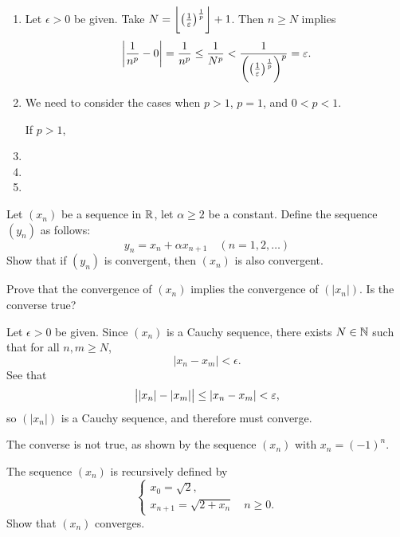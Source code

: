 \begin{solution} \
\begin{enumerate}[label=(\roman*)]
\item Let $\epsilon>0$ be given. Take $N=\left\lfloor \left(\frac{1}{\varepsilon}\right)^\frac{1}{p} \right\rfloor+1$. Then $n\ge N$ implies
\[\left|\frac{1}{n^p}-0\right|=\frac{1}{n^p}\le\frac{1}{N^p}<\frac{1}{\left(\left(\frac{1}{\varepsilon}\right)^\frac{1}{p}\right)^p}=\varepsilon.\]
\item We need to consider the cases when $p>1$, $p=1$, and $0<p<1$.

If $p>1$, 

\item 
\item 
\item 
\end{enumerate}
\end{solution}

\begin{exercise}
Let $(x_n)$ be a sequence in $\mathbb R$, let $\alpha\ge2$ be a constant. Define the sequence $(y_n)$ as follows:
\[y_n=x_n+\alpha x_{n+1}\quad(n=1,2,\dots)\]
Show that if $(y_n)$ is convergent, then $(x_n)$ is also convergent.
\end{exercise}

\begin{exercise}
Prove that the convergence of $(x_n)$ implies the convergence of $(|x_n|)$. Is the converse true?
\end{exercise}

\begin{solution}
Let $\epsilon>0$ be given. Since $(x_n)$ is a Cauchy sequence, there exists $N\in\mathbb N$ such that for all $n,m\ge N$,
\[|x_n-x_m|<\epsilon.\]
See that
\[\left||x_n|-|x_m|\right|\le|x_n-x_m|<\varepsilon,\]
so $(|x_n|)$ is a Cauchy sequence, and therefore must converge.

The converse is not true, as shown by the sequence $(x_n)$ with $x_n=(-1)^n$.
\end{solution}

\begin{exercise}
The sequence $(x_n)$ is recursively defined by
\[\begin{cases}
x_0=\sqrt{2},\\
x_{n+1}=\sqrt{2+x_n}\quad n\ge0.
\end{cases}\]
Show that $(x_n)$ converges.
\end{exercise}

